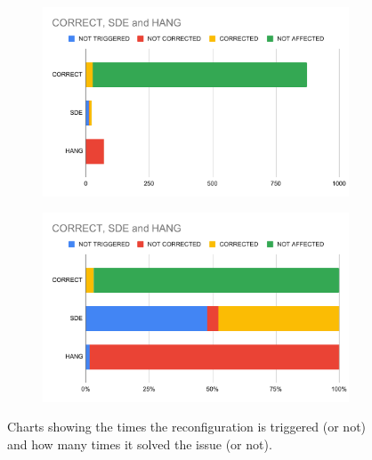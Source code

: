 \begin{figure}[H]
  \centering
  \begin{minipage}[t]{.49\linewidth}
  \begin{figure}[H]
  \centering
    \includegraphics[width=\linewidth]{images/chapter5/csh1.pdf}
  \end{figure}
  \end{minipage}
  \hfill
  \begin{minipage}[t]{.49\linewidth}
  \begin{figure}[H]
	\centering
    \includegraphics[width=\linewidth]{images/chapter5/csh2.pdf}
  \end{figure}
  \end{minipage}
  \caption{Charts showing the times the reconfiguration is triggered (or not) and how many times it solved the issue (or not).}
\end{figure}

